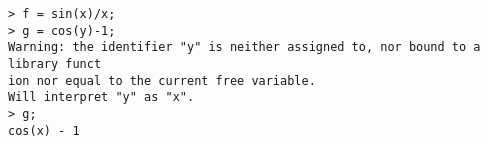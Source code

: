 \begin{center}\begin{minipage}{15cm}\begin{Verbatim}[frame=single]
> f = sin(x)/x;
> g = cos(y)-1;
Warning: the identifier "y" is neither assigned to, nor bound to a library funct
ion nor equal to the current free variable.
Will interpret "y" as "x".
> g;
cos(x) - 1
\end{Verbatim}
\end{minipage}\end{center}
